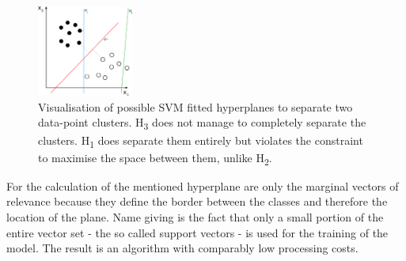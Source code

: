 \begin{figure} %
    \centerline{\includegraphics[trim={0 0 0 0},clip,width=0.28\textwidth]{img/Svm_separating_hyperplanes}}
  \caption{Visualisation of possible SVM fitted hyperplanes to separate two data-point clusters. H\textsubscript{3} does not manage to completely separate the clusters. H\textsubscript{1} does separate them entirely but violates the constraint to maximise the space between them, unlike H\textsubscript{2}.}
  \label{fig:SVM_visualisation}
\vspace{-0.5cm}
\end{figure}

For the calculation of the mentioned hyperplane are only the marginal vectors of relevance because they define the border between the classes and therefore the location of the plane. Name giving is the fact that only a small portion of the entire vector set - the so called support vectors - is used for the training of the model. The result is an algorithm with comparably low processing costs.

